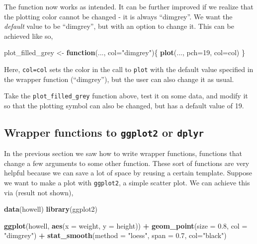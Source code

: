 \documentclass[]{book}
\newenvironment{Shaded}{\begin{snugshade}}{\end{snugshade}}
\newcommand{\ControlFlowTok}[1]{\textcolor[rgb]{0.13,0.29,0.53}{\textbf{#1}}}
\newcommand{\DataTypeTok}[1]{\textcolor[rgb]{0.13,0.29,0.53}{#1}}
\newcommand{\DecValTok}[1]{\textcolor[rgb]{0.00,0.00,0.81}{#1}}
\newcommand{\FloatTok}[1]{\textcolor[rgb]{0.00,0.00,0.81}{#1}}
\newcommand{\KeywordTok}[1]{\textcolor[rgb]{0.13,0.29,0.53}{\textbf{#1}}}
\newcommand{\NormalTok}[1]{#1}
\newcommand{\OperatorTok}[1]{\textcolor[rgb]{0.81,0.36,0.00}{\textbf{#1}}}
\newcommand{\StringTok}[1]{\textcolor[rgb]{0.31,0.60,0.02}{#1}}
\let\BeginKnitrBlock\begin \let\EndKnitrBlock\end
\begin{document}
The function now works as intended. It can be further improved if we realize that the plotting color cannot be changed - it is always ``dimgrey''. We want the \emph{default} value to be ``dimgrey'', but with an option to change it. This can be achieved like so,

\begin{Shaded}
\begin{Highlighting}[]
\NormalTok{plot_filled_grey <-}\StringTok{ }\ControlFlowTok{function}\NormalTok{(..., }\DataTypeTok{col=}\StringTok{"dimgrey"}\NormalTok{)\{}
  \KeywordTok{plot}\NormalTok{(..., }\DataTypeTok{pch=}\DecValTok{19}\NormalTok{, }\DataTypeTok{col=}\NormalTok{col)}
\NormalTok{\}}
\end{Highlighting}
\end{Shaded}

Here, \texttt{col=col} sets the color in the call to \texttt{plot} with the default value specified in the wrapper function (``dimgrey''), but the user can also change it as usual.

\BeginKnitrBlock{rmdtry}
Take the \texttt{plot\_filled\_grey} function above, test it on some data, and modify it so that the plotting symbol can also be changed, but has a default value of 19.
\EndKnitrBlock{rmdtry}

\hypertarget{wrapper-functions-to-ggplot2-or-dplyr}{%
\subsection{\texorpdfstring{Wrapper functions to \texttt{ggplot2} or \texttt{dplyr}}{Wrapper functions to ggplot2 or dplyr}}\label{wrapper-functions-to-ggplot2-or-dplyr}}

In the previous section we saw how to write wrapper functions, functions that change a few arguments to some other function. These sort of functions are very helpful because we can save a lot of space by reusing a certain template. Suppose we want to make a plot with \texttt{ggplot2}, a simple scatter plot. We can achieve this via (result not shown),

\begin{Shaded}
\begin{Highlighting}[]
\KeywordTok{data}\NormalTok{(howell)}
\KeywordTok{library}\NormalTok{(ggplot2)}

\KeywordTok{ggplot}\NormalTok{(howell, }\KeywordTok{aes}\NormalTok{(}\DataTypeTok{x =}\NormalTok{ weight, }\DataTypeTok{y =}\NormalTok{ height)) }\OperatorTok{+}
\StringTok{  }\KeywordTok{geom_point}\NormalTok{(}\DataTypeTok{size =} \FloatTok{0.8}\NormalTok{, }\DataTypeTok{col =} \StringTok{"dimgrey"}\NormalTok{) }\OperatorTok{+}
\StringTok{  }\KeywordTok{stat_smooth}\NormalTok{(}\DataTypeTok{method =} \StringTok{"loess"}\NormalTok{, }\DataTypeTok{span =} \FloatTok{0.7}\NormalTok{, }\DataTypeTok{col=}\StringTok{"black"}\NormalTok{)}
\end{Highlighting}
\end{Shaded}
\end{document}
